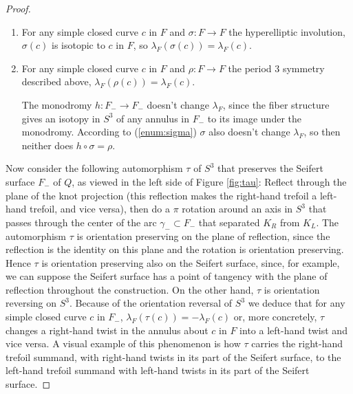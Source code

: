 \documentclass{amsart}
\newcommand{\sss}{\mbox{$\sigma$}}
\newcommand{\bdd}{\mbox{$\partial$}}
\begin{document}
\begin{proof}
\begin{enumerate}[ (a) ]
An isotopy in $F$ can be broken up into a series of isotopies in $F_-$ and (when the puncture in $F$ corresponding to $\bdd F_-$ is crossed) band sums to the curve $b$ described above.  We have just seen that both moves leave $\lambda_F$ unchanged.

\item \label{enum:sigma} For any simple closed curve $c$ in $F$ and $\sss: F \to F$ the hyperelliptic involution, $\sss(c)$ is isotopic to $c$ in $F$, so $\lambda_F(\sss(c)) = \lambda_F(c).$

\item \label{enum:rho} For any simple closed curve $c$ in $F$ and $\rho: F \to F$ the period $3$ symmetry described above, $\lambda_F(\rho(c)) = \lambda_F(c).$

The monodromy $h:F_- \to F_-$ doesn't change $\lambda_F$, since the fiber structure gives an isotopy in $S^3$ of any annulus in $F_-$ to its image under the monodromy.  According to (\ref{enum:sigma}) $\sss$ also doesn't change $\lambda_F$, so then neither does $h \circ \sss = \rho$.

\end{enumerate}

Now consider the following automorphism $\tau$ of $S^3$ that preserves the Seifert surface $F_-$ of $Q$, as viewed in the left side of Figure  \ref{fig:tau}:  Reflect through the plane of the knot projection (this reflection makes the right-hand trefoil a left-hand trefoil, and vice versa), then do a $\pi$ rotation around an axis in $S^3$ that passes through the center of the arc $\gamma_- \subset F_-$ that separated $K_R$ from $K_L$.  The automorphism $\tau$ is orientation preserving on the plane of reflection, since the reflection is the identity on this plane and the rotation is orientation preserving.  Hence $\tau$ is orientation preserving also on the Seifert surface, since, for example, we can suppose the Seifert surface has a point of tangency with the plane of reflection throughout the construction.  On the other hand, $\tau$ is orientation reversing on $S^3$.  Because of the orientation reversal of $S^3$ we deduce that for any simple closed curve $c$ in $F_-$, $\lambda_F(\tau(c)) = -\lambda_F(c)$ or, more concretely, $\tau$ changes a right-hand twist in the annulus about $c$ in $F$ into a left-hand twist and vice versa.  A visual example of this phenomenon is how $\tau$ carries the right-hand trefoil summand, with right-hand twists in its part of the Seifert surface, to the left-hand trefoil summand with left-hand twists in its part of the Seifert surface.


\end{proof}
\end{document}
